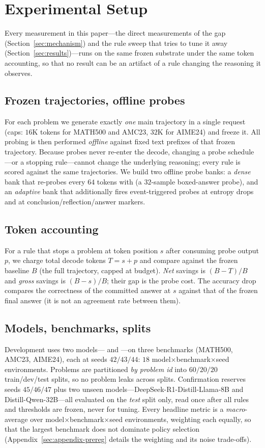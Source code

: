 \section{Experimental Setup}
\label{sec:method}

Every measurement in this paper---the direct measurements of the gap
(Section~\ref{sec:mechanism}) and the rule sweep that tries to tune it away
(Section~\ref{sec:results})---runs on the same frozen substrate under the same
token accounting, so that no result can be an artifact of a rule changing the
reasoning it observes.

\subsection{Frozen trajectories, offline probes}
For each problem we generate exactly \emph{one} main trajectory in a single
request (caps: $16$K tokens for \textsc{MATH}500 and AMC23, $32$K for AIME24)
and freeze it. All probing is then performed \emph{offline} against fixed text
prefixes of that frozen trajectory. Because probes never re-enter the decode,
changing a probe schedule---or a stopping rule---cannot change the underlying
reasoning; every rule is scored against the same trajectories. We build two
offline probe banks: a \emph{dense} bank that re-probes every $64$ tokens with
\simplek{} (a $32$-sample boxed-answer probe), and an \emph{adaptive} bank that
additionally fires event-triggered probes at entropy drops and at
conclusion/reflection/answer markers.

\subsection{Token accounting}
\label{sec:accounting}
For a rule that stops a problem at token position $s$ after consuming probe
output $p$, we charge total decode tokens $T=s+p$ and compare against the frozen
baseline $B$ (the full trajectory, capped at budget). \emph{Net} savings is
$(B-T)/B$ and \emph{gross} savings is $(B-s)/B$; their gap is the probe cost.
The accuracy drop compares the correctness of the committed answer at $s$
against that of the frozen final answer (it is not an agreement rate between
them).

\subsection{Models, benchmarks, splits}
\label{sec:resolution}
Development uses two models---\dsseven{} and \qweneight{}---on three benchmarks
(\textsc{MATH}500, AMC23, AIME24), each at seeds $42/43/44$: $18$
model$\times$benchmark$\times$seed environments. Problems are partitioned
\emph{by problem id} into $60/20/20$ train/dev/test splits, so no problem leaks
across splits. Confirmation reserves seeds $45/46/47$ plus two unseen
models---\mbox{DeepSeek-R1-Distill-Llama-8B} and \mbox{Distill-Qwen-32B}---all
evaluated on the \emph{test} split only, read once after all rules and
thresholds are frozen, never for tuning. Every headline metric is a
\emph{macro}-average over model$\times$benchmark$\times$seed environments,
weighting each equally, so that the largest benchmark does not dominate policy
selection (Appendix~\ref{sec:appendix-prereg} details the weighting and its
noise trade-offs).
